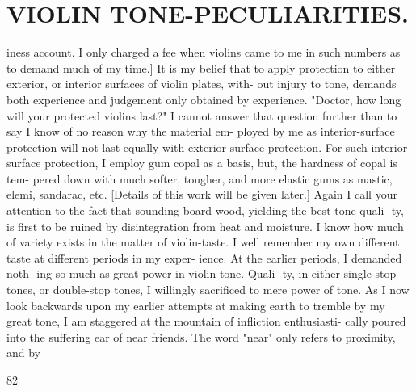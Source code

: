 \documentclass{article}
\begin{document}
\section*{VIOLIN TONE-PECULIARITIES.}
iness account. I only charged a fee when violins came to me in such numbers as to demand much of my time.] It is my belief that to apply protection to either exterior, or interior surfaces of violin plates, with- out injury to tone, demands both experience and judgement only obtained by experience. "Doctor, how long will your protected violins last?" I cannot answer that question further than to say I know of no reason why the material em- ployed by me as interior-surface protection will not last equally with exterior surface-protection. For such interior surface protection, I employ gum copal as a basis, but, the hardness of copal is tem- pered down with much softer, tougher, and more elastic gums as mastic, elemi, sandarac, etc. [Details of this work will be given later.] Again I call your attention to the fact that sounding-board wood, yielding the best tone-quali- ty, is first to be ruined by disintegration from heat and moisture. I know how much of variety exists in the matter of violin-taste. I well remember my own different taste at different periods in my exper- ience. At the earlier periods, I demanded noth- ing so much as great power in violin tone. Quali- ty, in either single-stop tones, or double-stop tones, I willingly sacrificed to mere power of tone. As I now look backwards upon my earlier attempts at making earth to tremble by my great tone, I am staggered at the mountain of infliction enthusiasti- cally poured into the suffering ear of near friends. The word "near" only refers to proximity, and by

82
\end{document}
